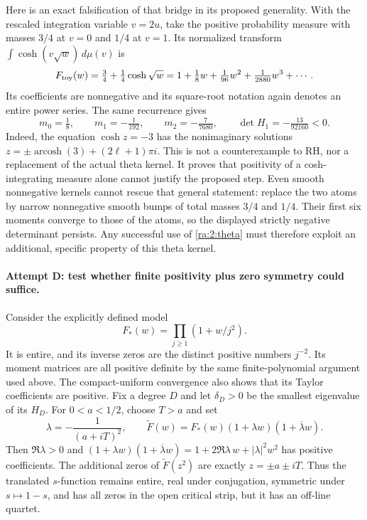 \documentclass[11pt]{article}
\begin{document}
Here is an exact falsification of that bridge in its proposed generality.
With the rescaled integration variable $v=2u$, take the positive probability
measure with masses $3/4$ at $v=0$ and $1/4$ at $v=1$. Its normalized transform
$\int\cosh(v\sqrt w)\,d\mu(v)$ is
\[
 F_{\rm toy}(w)=\tfrac34+\tfrac14\cosh\sqrt w
     =1+\tfrac18w+\tfrac1{96}w^2+\tfrac1{2880}w^3+\cdots.
\]
Its coefficients are nonnegative and its square-root notation again denotes
an entire power series. The same recurrence gives
\[
 m_0=\tfrac18,\qquad m_1=-\tfrac1{192},\qquad
 m_2=-\tfrac7{7680},\qquad
 \det H_1=-\tfrac{13}{92160}<0.
\]
Indeed, the equation $\cosh z=-3$ has the nonimaginary solutions
$z=\pm\operatorname{arcosh}(3)+(2\ell+1)\pi i$.
This is not a counterexample to RH, nor a replacement of the actual theta
kernel. It proves that positivity of a cosh-integrating measure alone cannot
justify the proposed step. Even smooth nonnegative kernels cannot rescue
that general statement: replace the two atoms by narrow nonnegative smooth
bumps of total masses $3/4$ and $1/4$. Their first six moments converge to
those of the atoms, so the displayed strictly negative determinant persists.
Any successful use of \eqref{ra:2:theta} must therefore exploit an additional,
specific property of this theta kernel.

\paragraph{Attempt D: test whether finite positivity plus zero symmetry could suffice.}
Consider the explicitly defined model
\[
 F_*(w)=\prod_{j\ge1}(1+w/j^2).
\]
It is entire, and its inverse zeros are the distinct positive numbers $j^{-2}$.
Its moment matrices are all positive definite by the same finite-polynomial
argument used above. The compact-uniform convergence also shows that its
Taylor coefficients are positive. Fix a degree $D$ and let $\delta_D>0$
be the smallest eigenvalue of its $H_D$. For $0<a<1/2$, choose $T>a$ and set
\begin{equation}\label{ra:2:perturb}
 \lambda=-\frac1{(a+iT)^2},\qquad
 \widetilde F(w)=F_*(w)(1+\lambda w)(1+\overline\lambda w).
\end{equation}
Then $\Re\lambda>0$ and
$(1+\lambda w)(1+\overline\lambda w)
=1+2\Re\lambda\,w+|\lambda|^2w^2$ has positive coefficients.
The additional zeros of $\widetilde F(z^2)$ are exactly
$z=\pm a\pm iT$. Thus the translated $s$-function remains entire, real under
conjugation, symmetric under $s\mapsto1-s$, and has all zeros in the open
critical strip, but it has an off-line quartet.
\end{document}
